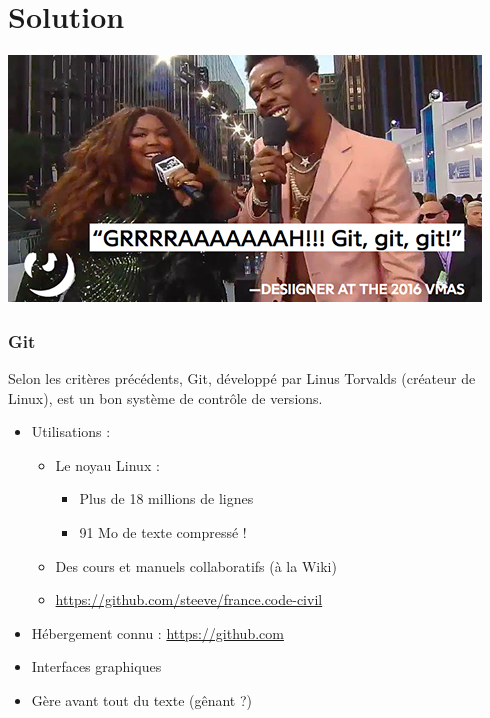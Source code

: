 \documentclass[compress]{beamer}
\begin{document}
\section{Solution}
\begin{frame}
	\center
	\includegraphics[width=\textwidth]{git-desiigner.png}
\end{frame}
\begin{frame}
	\frametitle{Git}
	Selon les critères précédents, Git,
	développé par Linus Torvalds (créateur de Linux),
	est un bon système de contrôle de versions. %

	\begin{itemize}
		\item Utilisations : \pause
			\begin{itemize}
				\item Le noyau Linux :
					\begin{itemize}
						\item Plus de 18 millions de lignes
						\item 91 Mo de texte compressé ! \pause
					\end{itemize}
				\item Des cours et manuels collaboratifs (à la Wiki) \pause
				\item \url{https://github.com/steeve/france.code-civil} \pause
			\end{itemize}
		\item Hébergement connu : \url{https://github.com} \pause
		\item Interfaces graphiques \pause
		\item Gère avant tout du texte (gênant ?)
	\end{itemize}
\end{frame}
\end{document}
